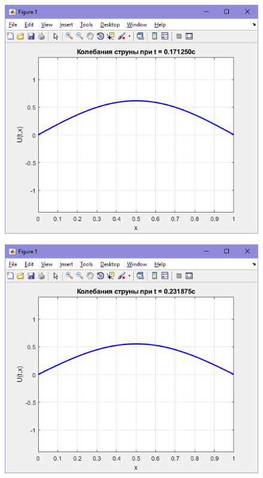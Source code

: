 \documentclass[a4paper]{article}
\begin{document}
\begin{figure}[]
    \begin{center}
    \begin{minipage}[h]{0.4\linewidth}
    \includegraphics[width=1\linewidth]{img/result_4.png}
    \caption{} %
    \label{ris:experimoriginal}
    \end{minipage}
    \end{center}
\end{figure}

\begin{figure}[]
    \begin{center}
    \begin{minipage}[h]{0.4\linewidth}
    \includegraphics[width=1\linewidth]{img/result_5.png}
    \caption{} %
    \label{ris:experimoriginal}
    \end{minipage}
    \end{center}
\end{figure}
\end{document}
